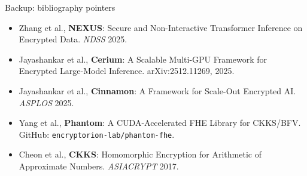 \documentclass[aspectratio=169]{beamer}
\begin{document}
\begin{frame}{Backup: bibliography pointers}
  \scriptsize
  \begin{itemize}
    \item Zhang et al., \textbf{NEXUS}: Secure and Non-Interactive Transformer
          Inference on Encrypted Data. \emph{NDSS} 2025.
    \item Jayashankar et al., \textbf{Cerium}: A Scalable Multi-GPU Framework
          for Encrypted Large-Model Inference. arXiv:2512.11269, 2025.
    \item Jayashankar et al., \textbf{Cinnamon}: A Framework for Scale-Out
          Encrypted AI. \emph{ASPLOS} 2025.
    \item Yang et al., \textbf{Phantom}: A CUDA-Accelerated FHE Library for
          CKKS/BFV. GitHub: \texttt{encryptorion-lab/phantom-fhe}.
    \item Cheon et al., \textbf{CKKS}: Homomorphic Encryption for Arithmetic
          of Approximate Numbers. \emph{ASIACRYPT} 2017.
  \end{itemize}
\end{frame}
\end{document}
